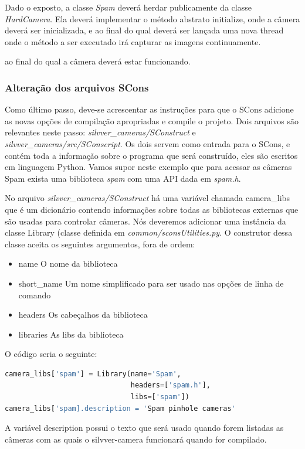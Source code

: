 \documentclass[a4paper,10pt]{article}
\begin{document}
Dado o exposto, a classe \emph{Spam} deverá herdar publicamente da classe
\emph{HardCamera}. Ela deverá implementar o método abstrato initialize, onde a
câmera deverá ser inicializada, e ao final do qual deverá ser lançada uma nova
thread onde o método a ser executado irá capturar as imagens continuamente.



ao final do qual a câmera deverá estar funcionando.

\subsubsection{Alteração dos arquivos SCons}
Como último passo, deve-se acrescentar as instruções para que o
SCons\cite{scons} adicione as novas opções de compilação apropriadas e compile
o projeto. Dois arquivos são relevantes neste passo:
\emph{silvver\_cameras/SConstruct} e
\emph{silvver\_cameras/src/SConscript}. Os dois servem como entrada para o
SCons, e contém toda a informação sobre o programa que será construído, eles
são escritos em linguagem Python. Vamos supor neste exemplo que para acessar
as câmeras Spam exista uma biblioteca \emph{spam} com uma API dada em
\emph{spam.h}.

No arquivo \emph{silvver\_cameras/SConstruct} há uma variável chamada
camera\_libs que é um dicionário contendo informações sobre todas as
bibliotecas externas que são usadas para controlar câmeras. Nós deveremos
adicionar uma instância da classe Library (classe definida em
\emph{common/sconsUtilities.py}. O construtor dessa classe aceita os seguintes
argumentos, fora de ordem:
\begin{itemize}
\item name O nome da biblioteca
\item short\_name Um nome simplificado para ser usado nas opções de linha de comando
\item headers Os cabeçalhos da biblioteca
\item libraries As libs da biblioteca
\end{itemize}
O código seria o seguinte:
\begin{lstlisting}[frame=lines,language=python]
camera_libs['spam'] = Library(name='Spam',
                              headers=['spam.h'],
                              libs=['spam'])
camera_libs['spam].description = 'Spam pinhole cameras'
\end{lstlisting}
A variável description possui o texto que será usado quando forem listadas
as câmeras com as quais o silvver-camera funcionará quando for compilado.
\end{document}
